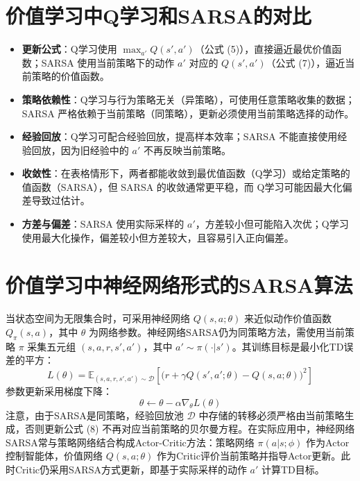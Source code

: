 \documentclass{article}
\begin{document}
\section{价值学习中Q学习和SARSA的对比}
\begin{itemize}
    \item \textbf{更新公式}：Q学习使用 \(\max_{a'} Q(s',a')\)（公式 (5)），直接逼近最优价值函数；SARSA 使用当前策略下的动作 \(a'\) 对应的 \(Q(s',a')\)（公式 (7)），逼近当前策略的价值函数。
    \item \textbf{策略依赖性}：Q学习与行为策略无关（异策略），可使用任意策略收集的数据；SARSA 严格依赖于当前策略（同策略），更新必须使用当前策略选择的动作。
    \item \textbf{经验回放}：Q学习可配合经验回放，提高样本效率；SARSA 不能直接使用经验回放，因为旧经验中的 \(a'\) 不再反映当前策略。
    \item \textbf{收敛性}：在表格情形下，两者都能收敛到最优值函数（Q学习）或给定策略的值函数（SARSA），但 SARSA 的收敛通常更平稳，而 Q学习可能因最大化偏差导致过估计。
    \item \textbf{方差与偏差}：SARSA 使用实际采样的 \(a'\)，方差较小但可能陷入次优；Q学习使用最大化操作，偏差较小但方差较大，且容易引入正向偏差。
\end{itemize}

\section{价值学习中神经网络形式的SARSA算法}
当状态空间为无限集合时，可采用神经网络 \(Q(s,a;\theta)\) 来近似动作价值函数 \(Q_\pi(s,a)\)，其中 \(\theta\) 为网络参数。神经网络SARSA仍为同策略方法，需使用当前策略 \(\pi\) 采集五元组 \((s,a,r,s',a')\)，其中 \(a' \sim \pi(\cdot|s')\)。其训练目标是最小化TD误差的平方：
\[
L(\theta) = \mathbb{E}_{(s,a,r,s',a')\sim\mathcal{D}} \left[ \bigl( r + \gamma Q(s',a';\theta) - Q(s,a;\theta) \bigr)^2 \right] \tag{8}
\]
参数更新采用梯度下降：
\[
\theta \leftarrow \theta - \alpha \nabla_\theta L(\theta) \tag{9}
\]
注意，由于SARSA是同策略，经验回放池 \(\mathcal{D}\) 中存储的转移必须严格由当前策略生成，否则更新公式 (8) 不再对应当前策略的贝尔曼方程。在实际应用中，神经网络SARSA常与策略网络结合构成Actor-Critic方法：策略网络 \(\pi(a|s;\phi)\) 作为Actor控制智能体，价值网络 \(Q(s,a;\theta)\) 作为Critic评价当前策略并指导Actor更新。此时Critic仍采用SARSA方式更新，即基于实际采样的动作 \(a'\) 计算TD目标。
\end{document}
